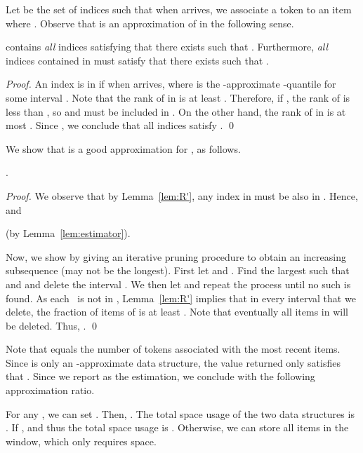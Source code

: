 \documentclass{llncs}
\begin{document}
Let  be
the set of indices  such that
when  arrives, we associate a token
to an item  where .
Observe that  is an approximation of 
in the following sense.

\begin{lemma}\label{lem:R'}
 contains \emph{all} indices  satisfying
that there exists  such that
.
Furthermore, \emph{all} indices  contained in
 must satisfy that
there exists  such that
.
\end{lemma}

\begin{proof}
An index  is in  if
 when  arrives, where
 is the -approximate -quantile
for some interval . Note that the rank of 
in  is at least .
Therefore, if ,
the rank of  is less than ,
so  and  must be included in .
On the other hand,
the rank of  in  is at most .
Since , we conclude that
all indices  satisfy .
\hfill\qed
\end{proof}

We show that  is a good approximation
for , as follows.

\begin{lemma} \label{lem:approx-estimator}
.
\end{lemma}
\begin{proof}
  We observe that by Lemma~\ref{lem:R'},
  any index  in  must be also
  in . Hence,  and
  
  (by Lemma~\ref{lem:estimator}).

  Now, we show  by giving an iterative pruning procedure to obtain an
  increasing subsequence (may not be the longest).  First let
   and
  .  Find the largest  such that  and
   and delete the interval .
  We then let  and repeat the process
  until no such  is found.
  As each~ is not in ,
  Lemma~\ref{lem:R'} implies that in every interval
  that we delete, the fraction of items of  is at
  least .
  Note that eventually all items in  will be deleted.
  Thus, .
\hfill\qed
\end{proof}

Note that  equals the number of tokens associated
with the most recent  items. Since  is only an -approximate
data structure, the value  returned only satisfies that
.
Since we report  as
the estimation, we conclude with the following approximation ratio.

\begin{lemma}

\end{lemma}

For any , we can set .
Then, .
The total space usage of the two data structures is
.
If , 
and thus the total space usage is .
Otherwise, we can store all items in the window, which
only requires  space.
\end{document}
